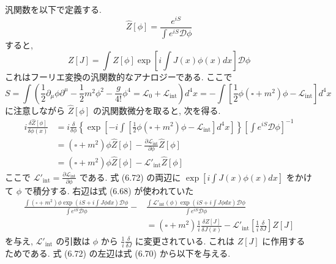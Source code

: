 \documentclass[a4paper,12pt]{article}
\begin{document}
汎関数を以下で定義する.
\begin{equation*}
    \hat{Z}[\phi] = \frac{e^{iS}}{\displaystyle \int e^{iS}\mathcal{D}\phi} \tag{6.69}
\end{equation*}
すると,
\begin{equation*}
    Z[J] = \int \hat{Z}[\phi]\exp\left[ i\int J(x)\phi(x) dx \right] \mathcal{D}\phi \tag{6.70}
\end{equation*}
これはフーリエ変換の汎関数的なアナロジーである. ここで
\begin{equation*}
    S = \int \left(\frac{1}{2}\partial_\mu \phi \partial^\mu -\frac{1}{2}m^2 \phi^2 -\frac{g}{4!}\phi^4 = \mathcal{L}_0 + \mathcal{L}_\textrm{int}\right) d^4 x = -\int \left[ \frac{1}{2}\phi (\square + m^2)\phi - \mathcal{L}_\textrm{int} \right] d^4 x \tag{6.71}
\end{equation*}
に注意しながら $\hat{Z}[\phi]$ の汎関数微分を取ると, 次を得る.
\begin{align*}
    i\frac{\delta \hat{Z}[\phi]}{\delta \phi(x)} &= i\frac{\delta}{\delta \phi}\left\{ \exp\left[ -i\int \left[ \frac{1}{2}\phi (\square + m^2)\phi - \mathcal{L}_\textrm{int} \right]d^4 x \right] \right\}\left[ \int e^{iS}\mathcal{D}\phi \right]^{-1}\\
    &= (\square + m^2)\phi \hat{Z}[\phi] -\frac{\partial \mathcal{L}_\textrm{int}}{\partial \phi}\hat{Z}[\phi]\\
    &= (\square + m^2)\phi \hat{Z}[\phi] - \mathcal{L}'_\textrm{int}\hat{Z}[\phi] \tag{6.72}
\end{align*}
ここで $\mathcal{L}'_\textrm{int} = \displaystyle \frac{\partial \mathcal{L}_\textrm{int}}{\partial \phi}$ である. 式 (6.72) の両辺に $\displaystyle \exp\left[ i\int J(x)\phi(x)dx \right]$ をかけて $\phi$ で積分する. 右辺は式 (6.68) が使われていた
\begin{align*}
    \frac{\displaystyle \int (\square + m^2)\phi \exp\left( iS + i\int J\phi dx \right)\mathcal{D}\phi}{\displaystyle \int e^{iS}\mathcal{D}\phi} -& \frac{\displaystyle \int \mathcal{L}'_{\textrm{int}}(\phi) \exp\left( iS + i\int J\phi dx \right)\mathcal{D}\phi}{\displaystyle \int e^{iS}\mathcal{D}\phi} \\
    &= (\square + m^2)\frac{1}{i}\frac{\delta Z[J]}{\delta J(x)} - \mathcal{L}'_{\textrm{int}}\left[ \frac{1}{i}\frac{\delta}{\delta J} \right]Z[J] \tag{6.73}
\end{align*}
を与え, $\mathcal{L}'_{\textrm{int}}$ の引数は $\phi$ から $\displaystyle \frac{1}{i}\frac{\delta}{\delta J}$ に変更されている. これは $Z[J]$ に作用するためである. 式 (6.72) の左辺は式 (6.70) から以下を与える.
\end{document}
